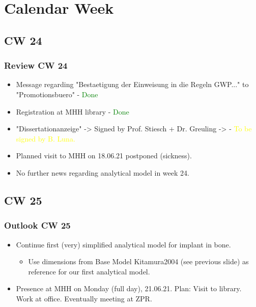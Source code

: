 \section{Calendar Week}
\subsection{CW 24}
\begin{frame}
  \frametitle{Review CW 24}
	\begin{itemize}
	\item Message regarding "Bestaetigung der Einweisung in die Regeln GWP..." to "Promotionsbuero" - \textcolor{green}{Done}
	\item Registration at MHH library - \textcolor{green}{Done}
	\item "Dissertationanzeige" -> Signed by Prof. Stiesch + Dr. Greuling -> - \textcolor{yellow}{To be signed by B. Luna.} 
	\item Planned visit to MHH on 18.06.21 postponed (sickness).
	\item No further news regarding analytical model in week 24.
	
	\end{itemize}
\end{frame}
\subsection{CW 25}
\begin{frame}
  \frametitle{Outlook CW 25}
  \begin{itemize}
		\item Continue first (very) simplified analytical model for implant in bone.
		\begin{itemize}
			\item Use dimensions from Base Model Kitamura2004 (see previous slide) as reference for our first analytical model.
		\end{itemize}
		\item Presence at MHH on Monday (full day), 21.06.21. Plan: Visit to library. Work at office. Eventually meeting at ZPR.
	\end{itemize}
\end{frame}

